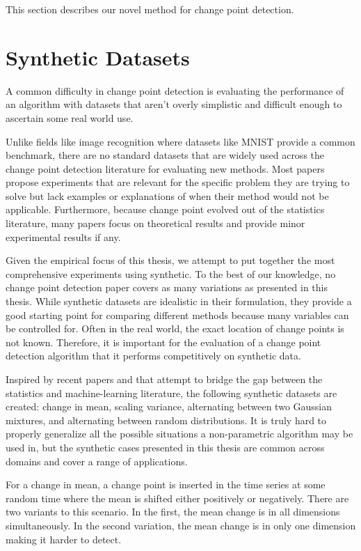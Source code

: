 This section describes our novel method for change point detection.


\section{Synthetic Datasets}
A common difficulty in change point detection is evaluating the performance of an algorithm with datasets that aren't overly simplistic and difficult enough to ascertain some real world use.

Unlike fields like image recognition where datasets like MNIST provide a common benchmark, there are no standard datasets that are widely used across the change point detection literature for evaluating new methods. Most papers propose experiments that are relevant for the specific problem they are trying to solve  but lack examples or explanations of when their method would not be applicable.  Furthermore, because change point evolved out of the statistics literature, many papers focus on theoretical results and provide minor experimental results if any.

Given the empirical focus of this thesis, we attempt to put together the most comprehensive experiments using synthetic. To the best of our knowledge, no change point detection paper covers as many variations as presented in this thesis. While synthetic datasets are idealistic in their formulation, they provide a good starting point for comparing different methods because many variables can be controlled for. Often in the real world, the exact location of change points is not known. Therefore, it is important for the evaluation of a change point detection algorithm that it performs competitively on synthetic data.

Inspired by recent papers \cite{chang2019kernel} and \cite{flynn2019change} that attempt to bridge the gap between the statistics and machine-learning literature, the following synthetic datasets are created: change in mean, scaling variance, alternating between two Gaussian mixtures, and alternating between random distributions. It is truly hard to properly generalize all the possible situations a non-parametric algorithm may be used in, but the synthetic cases presented in this thesis are common across domains and cover a range of applications.

For a change in mean, a change point is inserted in the time series at some random time where the mean is shifted either positively or negatively. There are two variants to this scenario. In the first, the mean change is in all dimensions simultaneously. In the second variation, the mean change is in only one dimension making it harder to detect. 

